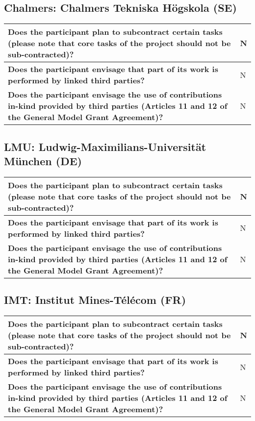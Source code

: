 \subsection{Chalmers: Chalmers Tekniska Högskola (SE)}

\begin{longtable}{|p{}|p{}|}
\hline
{\bf Does the participant plan to subcontract certain tasks (please
  note that core tasks of the project should not be sub-contracted)?}
&
N
\\
\hline
{\bf Does the participant envisage that  part of its work is performed
  by linked third parties?}
&
N
\\
\hline
{\bf Does the participant envisage the use of contributions in-kind
provided by third parties (Articles 11 and 12 of the General Model
Grant Agreement)?}
&
N
\\
\hline
\end{longtable}

\subsection{LMU: Ludwig-Maximilians-Universität München (DE)}

\begin{longtable}{|p{}|p{}|}
\hline
{\bf Does the participant plan to subcontract certain tasks (please
  note that core tasks of the project should not be sub-contracted)?}
&
N
\\
\hline
{\bf Does the participant envisage that  part of its work is performed
  by linked third parties?}
&
N
\\
\hline
{\bf Does the participant envisage the use of contributions in-kind
provided by third parties (Articles 11 and 12 of the General Model
Grant Agreement)?}
&
N
\\
\hline
\end{longtable}

\subsection{IMT: Institut Mines-Télécom (FR)}

\begin{longtable}{|p{}|p{}|}
\hline
{\bf Does the participant plan to subcontract certain tasks (please
  note that core tasks of the project should not be sub-contracted)?}
&
N
\\
\hline
{\bf Does the participant envisage that  part of its work is performed
  by linked third parties?}
&
N
\\
\hline
{\bf Does the participant envisage the use of contributions in-kind
provided by third parties (Articles 11 and 12 of the General Model
Grant Agreement)?}
&
N
\\
\hline
\end{longtable}

